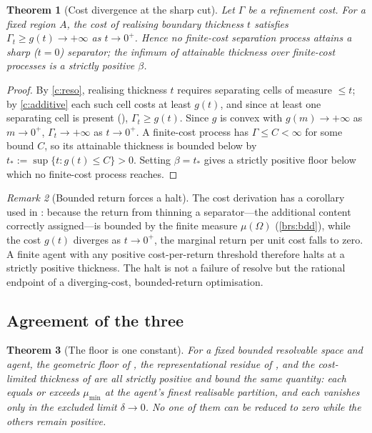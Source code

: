 \documentclass[11pt,twocolumn,a4paper]{article}
\theoremstyle{thmstyle}
\newtheorem{theorem}{Theorem}[section]
\theoremstyle{definition}
\theoremstyle{remark}
\newtheorem{remark}[theorem]{Remark}
\newcommand{\Space}{\Omega}
\newcommand{\thick}{\beta}
\newcommand{\reso}{\delta}
\begin{document}
\begin{theorem}[Cost divergence at the sharp cut]
\label{thm:cost}
Let $\Gamma$ be a refinement cost. For a fixed region $A$, the cost of realising
boundary thickness $t$ satisfies $\Gamma_t\ge g(t)\to+\infty$ as $t\to0^+$.
Hence no finite-cost separation process attains a sharp ($t=0$) separator; the
infimum of attainable thickness over finite-cost processes is a strictly
positive $\thick$.
\end{theorem}

\begin{proof}
By \ref{c:reso}, realising thickness $t$ requires separating cells of measure
$\le t$; by \ref{c:additive} each such cell costs at least $g(t)$, and since at
least one separating cell is present (),
$\Gamma_t\ge g(t)$. Since $g$ is convex with $g(m)\to+\infty$ as $m\to0^+$,
$\Gamma_t\to+\infty$ as $t\to0^+$. A finite-cost process has $\Gamma\le C<\infty$
for some bound $C$, so its attainable thickness is bounded below by
$t_\ast:=\sup\{t:g(t)\le C\}>0$. Setting $\thick=t_\ast$ gives a strictly
positive floor below which no finite-cost process reaches.
\end{proof}

\begin{remark}[Bounded return forces a halt]
\label{rem:bounded-return}
The cost derivation has a corollary used in : because the
return from thinning a separator---the additional content correctly assigned---is
bounded by the finite measure $\mu(\Space)$ (\ref{brs:bdd}), while the cost
$g(t)$ diverges as $t\to0^+$, the marginal return per unit cost falls to zero.
A finite agent with any positive cost-per-return threshold therefore halts at a
strictly positive thickness. The halt is not a failure of resolve but the
rational endpoint of a diverging-cost, bounded-return optimisation.
\end{remark}

\subsection{Agreement of the three}

\begin{theorem}[The floor is one constant]
\label{thm:floor-agree}
For a fixed bounded resolvable space and agent, the geometric floor of
, the representational residue of , and
the cost-limited thickness of  are all strictly positive and
bound the same quantity: each equals or exceeds $\mu_{\min}$ at the agent's
finest realisable partition, and each vanishes only in the excluded limit
$\reso\to0$. No one of them can be reduced to zero while the others remain
positive.
\end{theorem}
\end{document}

